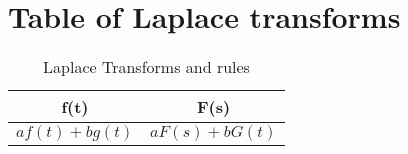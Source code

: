 \section{Table of Laplace transforms}
\begin{table}[h!]
    \centering
    \caption{Laplace Transforms and rules}
\begin{tabular}{|c | c|}
    \hline 
     f(t) & F(s) \\
    \hline 
     $a f(t) + b g(t)$ & $a F(s) + b G(t)$\\
     \hline 
\end{tabular}
    \label{tab:laplacetrans}
\end{table}
